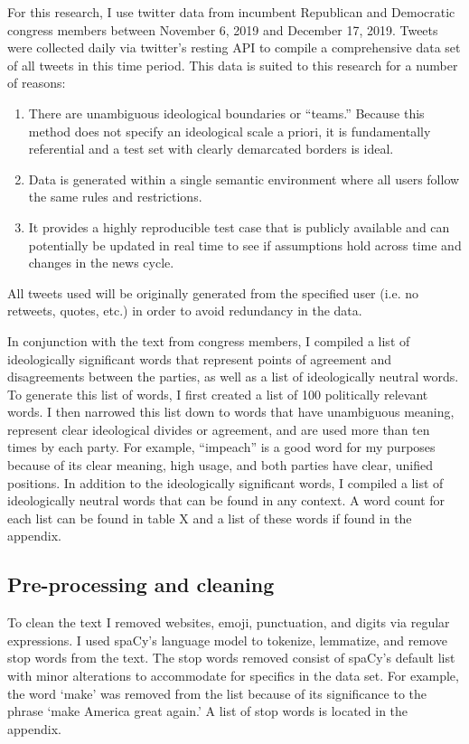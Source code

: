 \documentclass[../embeddings.tex]{subfiles}
\begin{document}
For this research, I use twitter data from incumbent Republican and Democratic congress members between November 6, 2019 and December 17, 2019. Tweets were collected daily via twitter’s resting API to compile a comprehensive data set of all tweets in this time period. This data is suited to this research for a number of reasons:

\begin{enumerate}
\item There are unambiguous ideological boundaries or “teams.” Because this method does not specify an ideological scale a priori, it is fundamentally referential and a test set with clearly demarcated borders is ideal.
\item Data is generated within a single semantic environment where all users follow the same rules and restrictions.
\item It provides a highly reproducible test case that is publicly available and can potentially be updated in real time to see if assumptions hold across time and changes in the news cycle.
\end{enumerate}
All tweets used will be originally generated from the specified user (i.e. no retweets, quotes, etc.) in order to avoid redundancy in the data.

In conjunction with the text from congress members, I compiled a list of ideologically significant words that represent points of agreement and disagreements between the parties, as well as a list of ideologically neutral words. To generate this list of words, I  first created a list of 100 politically relevant words. I then narrowed this list down to words that have unambiguous meaning, represent clear ideological divides or agreement, and are used more than ten times by each party. For example, “impeach” is a good word for my purposes because of its clear meaning, high usage, and both parties have clear, unified positions.  In addition to the ideologically significant words, I compiled a list of ideologically neutral words that can be found in any context. A word count for each list can be found in table X and a list of these words if found in the appendix.

\subsection{Pre-processing and cleaning}
To clean the text I removed websites, emoji, punctuation, and digits via regular expressions. I used spaCy’s language model to tokenize, lemmatize, and remove stop words from the text. The stop words removed consist of spaCy’s default list with minor alterations to accommodate for specifics in the data set. For example, the word ‘make’ was removed from the list because of its significance to the phrase ‘make America great again.’ A list of stop words is located in the appendix.
\end{document}
